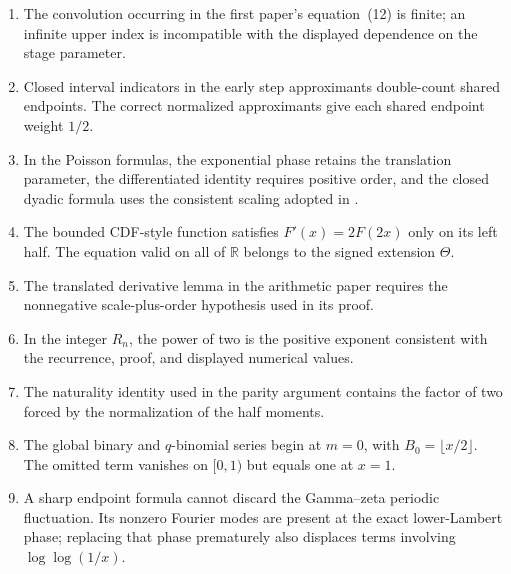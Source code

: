 \documentclass[11pt]{article}
\numberwithin{equation}{section}
\theoremstyle{definition}
\theoremstyle{remark}
\newcommand{\R}{\mathbb{R}}
\newcommand{\Th}{\Theta}
\begin{document}
\begin{enumerate}[label=\arabic*.]
\item The convolution occurring in the first paper's equation~(12) is finite;
an infinite upper index is incompatible with the displayed dependence on the
stage parameter.

\item Closed interval indicators in the early step approximants double-count
shared endpoints.  The correct normalized approximants give each shared
endpoint weight $1/2$.

\item In the Poisson formulas, the exponential phase retains the translation
parameter, the differentiated identity requires positive order, and the
closed dyadic formula uses the consistent scaling adopted in
.

\item The bounded CDF-style function satisfies $F'(x)=2F(2x)$ only on its left
half.  The equation valid on all of $\R$ belongs to the signed extension
$\Th$.

\item The translated derivative lemma in the arithmetic paper requires the
nonnegative scale-plus-order hypothesis used in its proof.

\item In the integer $R_n$, the power of two is the positive exponent
consistent with the recurrence, proof, and displayed numerical values.

\item The naturality identity used in the parity argument contains the factor
of two forced by the normalization of the half moments.

\item The global binary and $q$-binomial series begin at $m=0$, with
$B_0=\lfloor x/2\rfloor$.  The omitted term vanishes on $[0,1)$ but equals one
at $x=1$.

\item A sharp endpoint formula cannot discard the Gamma--zeta periodic
fluctuation.  Its nonzero Fourier modes are present at the exact lower-Lambert
phase; replacing that phase prematurely also displaces terms involving
$\log\log(1/x)$.
\end{enumerate}
\end{document}
